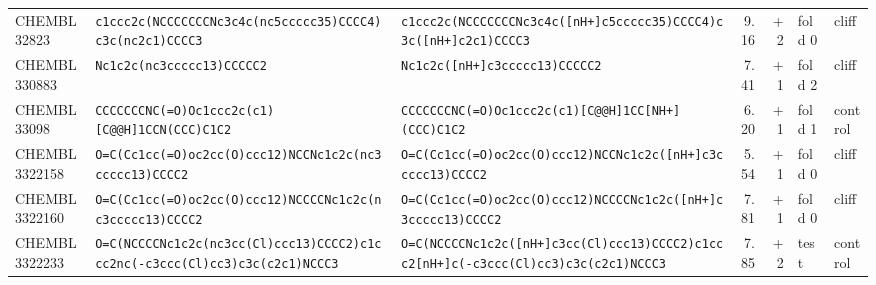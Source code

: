 \begin{longtable}{l p{4.4cm} p{4.4cm} r r l l}
CHEMBL32823 & \texttt{c1ccc2c(\allowbreak{}NCCCCCCCNc3c4c(\allowbreak{}nc5ccccc35)\allowbreak{}CCCC4)\allowbreak{}c3c(\allowbreak{}nc2c1)\allowbreak{}CCCC3} & \texttt{c1ccc2c(\allowbreak{}NCCCCCCCNc3c4c(\allowbreak{}[nH+]\allowbreak{}c5ccccc35)\allowbreak{}CCCC4)\allowbreak{}c3c(\allowbreak{}[nH+]\allowbreak{}c2c1)\allowbreak{}CCCC3} & 9.16 & +2 & fold 0 & cliff \\
CHEMBL330883 & \texttt{Nc1c2c(\allowbreak{}nc3ccccc13)\allowbreak{}CCCCC2} & \texttt{Nc1c2c(\allowbreak{}[nH+]\allowbreak{}c3ccccc13)\allowbreak{}CCCCC2} & 7.41 & +1 & fold 2 & cliff \\
CHEMBL33098 & \texttt{CCCCCCCNC(\allowbreak{}=\allowbreak{}O)\allowbreak{}Oc1ccc2c(\allowbreak{}c1)\allowbreak{}[C@@H]\allowbreak{}1CCN(\allowbreak{}CCC)\allowbreak{}C1C2} & \texttt{CCCCCCCNC(\allowbreak{}=\allowbreak{}O)\allowbreak{}Oc1ccc2c(\allowbreak{}c1)\allowbreak{}[C@@H]\allowbreak{}1CC[NH+]\allowbreak{}(\allowbreak{}CCC)\allowbreak{}C1C2} & 6.20 & +1 & fold 1 & control \\
CHEMBL3322158 & \texttt{O=\allowbreak{}C(\allowbreak{}Cc1cc(\allowbreak{}=\allowbreak{}O)\allowbreak{}oc2cc(\allowbreak{}O)\allowbreak{}ccc12)\allowbreak{}NCCNc1c2c(\allowbreak{}nc3ccccc13)\allowbreak{}CCCC2} & \texttt{O=\allowbreak{}C(\allowbreak{}Cc1cc(\allowbreak{}=\allowbreak{}O)\allowbreak{}oc2cc(\allowbreak{}O)\allowbreak{}ccc12)\allowbreak{}NCCNc1c2c(\allowbreak{}[nH+]\allowbreak{}c3ccccc13)\allowbreak{}CCCC2} & 5.54 & +1 & fold 0 & cliff \\
CHEMBL3322160 & \texttt{O=\allowbreak{}C(\allowbreak{}Cc1cc(\allowbreak{}=\allowbreak{}O)\allowbreak{}oc2cc(\allowbreak{}O)\allowbreak{}ccc12)\allowbreak{}NCCCCNc1c2c(\allowbreak{}nc3ccccc13)\allowbreak{}CCCC2} & \texttt{O=\allowbreak{}C(\allowbreak{}Cc1cc(\allowbreak{}=\allowbreak{}O)\allowbreak{}oc2cc(\allowbreak{}O)\allowbreak{}ccc12)\allowbreak{}NCCCCNc1c2c(\allowbreak{}[nH+]\allowbreak{}c3ccccc13)\allowbreak{}CCCC2} & 7.81 & +1 & fold 0 & cliff \\
CHEMBL3322233 & \texttt{O=\allowbreak{}C(\allowbreak{}NCCCCNc1c2c(\allowbreak{}nc3cc(\allowbreak{}Cl)\allowbreak{}ccc13)\allowbreak{}CCCC2)\allowbreak{}c1ccc2nc(\allowbreak{}-c3ccc(\allowbreak{}Cl)\allowbreak{}cc3)\allowbreak{}c3c(\allowbreak{}c2c1)\allowbreak{}NCCC3} & \texttt{O=\allowbreak{}C(\allowbreak{}NCCCCNc1c2c(\allowbreak{}[nH+]\allowbreak{}c3cc(\allowbreak{}Cl)\allowbreak{}ccc13)\allowbreak{}CCCC2)\allowbreak{}c1ccc2[nH+]\allowbreak{}c(\allowbreak{}-c3ccc(\allowbreak{}Cl)\allowbreak{}cc3)\allowbreak{}c3c(\allowbreak{}c2c1)\allowbreak{}NCCC3} & 7.85 & +2 & test & control \\

\end{longtable}
